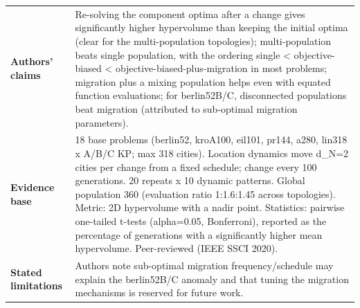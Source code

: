 \documentclass[
  a4paper,
  11pt,
  headings=small,
  numbers=noenddot,
  abstract=on,
  parskip=half,
]{scrartcl}
\begin{document}
\begin{landscape}
\begin{longtable}{@{}p{2.6cm}p{8.7cm}p{2.6cm}p{8.7cm}@{}}
\textbf{Authors' claims} & \multicolumn{3}{p{20.0cm}}{Re-solving the component optima after a change gives significantly higher hypervolume than keeping the initial optima (clear for the multi-population topologies); multi-population beats single population, with the ordering single < objective-biased < objective-biased-plus-migration in most problems; migration plus a mixing population helps even with equated function evaluations; for berlin52B/C, disconnected populations beat migration (attributed to sub-optimal migration parameters).} \\
\textbf{Evidence base} & \multicolumn{3}{p{20.0cm}}{18 base problems (berlin52, kroA100, eil101, pr144, a280, lin318 x A/B/C KP; max 318 cities). Location dynamics move d\_N=2 cities per change from a fixed schedule; change every 100 generations. 20 repeats x 10 dynamic patterns. Global population 360 (evaluation ratio 1:1.6:1.45 across topologies). Metric: 2D hypervolume with a nadir point. Statistics: pairwise one-tailed t-tests (alpha=0.05, Bonferroni), reported as the percentage of generations with a significantly higher mean hypervolume. Peer-reviewed (IEEE SSCI 2020).} \\
\textbf{Stated limitations} & \multicolumn{3}{p{20.0cm}}{Authors note sub-optimal migration frequency/schedule may explain the berlin52B/C anomaly and that tuning the migration mechanisms is reserved for future work.} \\

\end{longtable}
\end{landscape}
\end{document}
